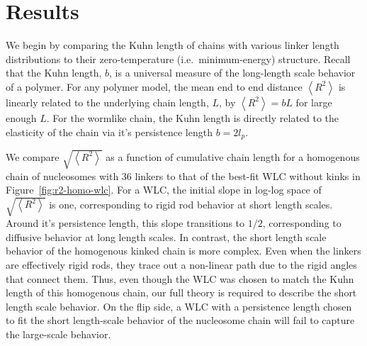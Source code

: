 \documentclass[%
 reprint,
superscriptaddress,
showpacs,preprintnumbers,
 amsmath,amssymb,
 aps,
 prl,
]{revtex4-1}
\newcommand{\RR}{\left\langle{}R^2\right\rangle{}}
\begin{document}
\section{\label{sec:results}Results}
We begin by comparing the Kuhn length of chains with various linker length
    distributions to their zero-temperature (i.e.\ minimum-energy) structure.
Recall that the Kuhn length, $b$, is a universal measure of the long-length
    scale behavior of a polymer.
For any polymer model, the mean end to end distance $\RR$ is linearly related to the
    underlying chain length, $L$, by $\RR = bL$ for large enough $L$.
For the wormlike chain, the Kuhn length is directly related to the elasticity of
    the chain via it's persistence length $b = 2l_p$.

We compare $\sqrt{\RR}$ as a
function of cumulative chain length for a homogenous chain of
nucleosomes with \SI{36}{\basepair} linkers to that of the best-fit WLC without
kinks in Figure~\ref{fig:r2-homo-wlc}.
For a WLC, the initial slope in log-log space of $\sqrt{\RR}$ is one,
    corresponding to rigid rod behavior at short length scales.
Around it's persistence length, this slope transitions to $1/2$, corresponding
    to diffusive behavior at long length scales.
In contrast, the short length scale behavior of the homogenous kinked chain is more
    complex. Even when the linkers are effectively rigid rods, they trace
    out a non-linear path due to the rigid angles that connect them.
Thus, even though the WLC was chosen to match the Kuhn length of this
    homogenous chain, our full theory is required to describe the short length
    scale behavior. On the flip side, a WLC with a persistence length chosen to fit the short length-scale behavior of the nucleosome chain will fail to capture the large-scale behavior.
\end{document}
